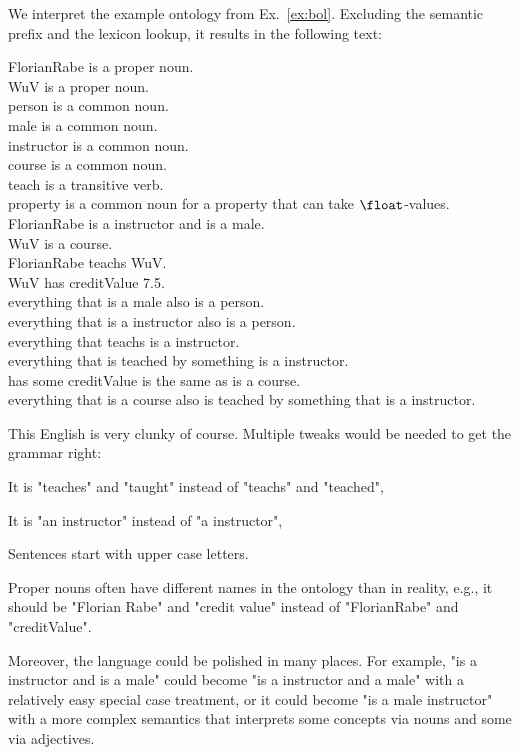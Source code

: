 \begin{example}
We interpret the example ontology from Ex.~\ref{ex:bol}.
Excluding the semantic prefix and the lexicon lookup, it results in the following text:
\medskip

FlorianRabe is a proper noun.\\
WuV is a proper noun.\\
person is a common noun.\\
male is a common noun.\\
instructor is a common noun.\\
course is a common noun.\\
teach is a transitive verb.\\
property is a common noun for a property that can take $\float$-values.\\
FlorianRabe is a instructor and is a male.\\
WuV is a course.\\
FlorianRabe teachs WuV.\\
WuV has creditValue 7.5.\\
everything that is a male also is a person.\\
everything that is a instructor also is a person.\\
everything that teachs is a instructor.\\
everything that is teached by something is a instructor.\\
has some creditValue is the same as is a course.\\
everything that is a course also is teached by something that is a instructor.
\medskip

This English is very clunky of course.
Multiple tweaks would be needed to get the grammar right:
\begin{compactitem}
 \item It is "teaches" and "taught" instead of "teachs" and "teached",
 \item It is "an instructor" instead of "a instructor",
 \item Sentences start with upper case letters.
 \item Proper nouns often have different names in the ontology than in reality, e.g., it should be "Florian Rabe" and "credit value" instead of "FlorianRabe" and "creditValue".
\end{compactitem}
Moreover, the language could be polished in many places.
For example, "is a instructor and is a male" could become "is a instructor and a male" with a relatively easy special case treatment, or it could become "is a male instructor" with a more complex semantics that interprets some concepts via nouns and some via adjectives.
\end{example}

